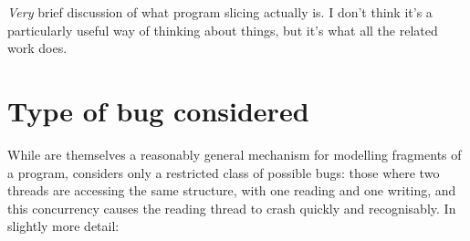 \emph{Very} brief discussion of what program slicing actually is.  I
don't think it's a particularly useful way of thinking about things,
but it's what all the related work does.

\section{Type of bug considered}
\label{sect:intro:types_of_bugs}

While {\StateMachines} are themselves a reasonably general mechanism
for modelling fragments of a program, {\implementation} considers only
a restricted class of possible bugs: those where two threads are
accessing the same structure, with one reading and one writing, and
this concurrency causes the reading thread to crash quickly and
recognisably.  In slightly more detail:

